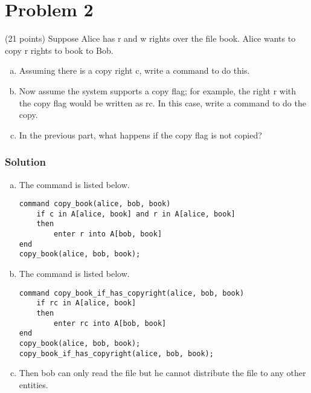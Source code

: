 \section*{Problem 2}
 (21 points) Suppose Alice has r and w rights over the file book. Alice wants to copy r rights to book to Bob.
\begin{enumerate}[(a)]
    \item Assuming there is a copy right c, write a command to do this.
    \item Now assume the system supports a copy flag; for example, the right r with the copy flag would be written as rc. In this case, write a command to do the copy.
    \item In the previous part, what happens if the copy flag is not copied?
\end{enumerate}

\subsubsection*{Solution}

\begin{enumerate}[(a)]
    \item  The command is listed below.

          \begin{minipage}{\linewidth}\begin{lstlisting}
command copy_book(alice, bob, book)
    if c in A[alice, book] and r in A[alice, book]
    then
        enter r into A[bob, book]
end
copy_book(alice, bob, book);
          \end{lstlisting}\end{minipage}
    \item The command is listed below.

          \begin{minipage}{\linewidth}\begin{lstlisting}
command copy_book_if_has_copyright(alice, bob, book)
    if rc in A[alice, book] 
    then
        enter rc into A[bob, book]
end
copy_book(alice, bob, book);
copy_book_if_has_copyright(alice, bob, book);
          \end{lstlisting}\end{minipage}
    \item Then bob can only read the file but he cannot distribute the file to any other entities.
\end{enumerate}

